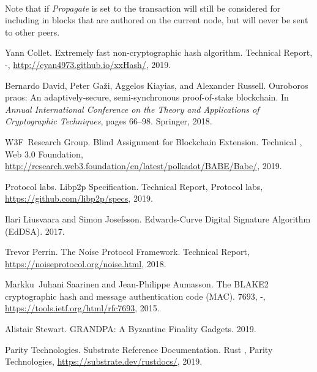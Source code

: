 \documentclass{book}
\newcommand{\tmem}[1]{{\em #1\/}}
\newcommand{\tmtextit}[1]{{\itshape{#1}}}
\newcommand{\tmtexttt}[1]{{\ttfamily{#1}}}
\newcommand{\tmverbatim}[1]{{\ttfamily{#1}}}
\providecommand{\tmem}[1]{\tmtextit{#1}}
\providecommand{\tmtextit}[1]{\tmtextit{#1}}
\providecommand{\tmverbatim}[1]{\tmtexttt{#1}}
\begin{document}
\

Note that if {\tmem{Propagate}} is set to \tmverbatim{false} the transaction
will still be considered for including in blocks that are authored on the
current node, but will never be sent to other peers.

\begin{thebibliography}{DGKR18}
  Yann Collet. {\newblock}Extremely fast
  non-cryptographic hash algorithm. {\newblock}Technical Report, -,
  \url{http://cyan4973.github.io/xxHash/}, 2019.{\newblock}
  
  Bernardo David, Peter Ga{\v z}i,
  Aggelos Kiayias, and  Alexander Russell. {\newblock}Ouroboros praos: An
  adaptively-secure, semi-synchronous proof-of-stake blockchain. {\newblock}In
  \tmtextit{Annual International Conference on the Theory and Applications of
  Cryptographic Techniques},  pages  66--98. Springer, 2018.{\newblock}
  
  W3F~Research Group.
  {\newblock}Blind Assignment for Blockchain Extension. {\newblock}Technical
  {}, Web 3.0 Foundation,
  \url{http://research.web3.foundation/en/latest/polkadot/BABE/Babe/},
  2019.{\newblock}
  
  Protocol labs. {\newblock}Libp2p
  Specification. {\newblock}Technical Report, Protocol labs,
  \url{https://github.com/libp2p/specs}, 2019.{\newblock}
  
  Ilari Liusvaara  and  Simon
  Josefsson. {\newblock}Edwards-Curve Digital Signature Algorithm (EdDSA).
  {\newblock}2017.{\newblock}
  
  Trevor Perrin. {\newblock}The Noise
  Protocol Framework. {\newblock}Technical Report,
  \url{https://noiseprotocol.org/noise.html}, 2018.{\newblock}
  
  Markku~Juhani Saarinen  and 
  Jean-Philippe Aumasson. {\newblock}The BLAKE2 cryptographic hash and message
  authentication code (MAC). {\newblock}{} 7693, -,
  \url{https://tools.ietf.org/html/rfc7693}, 2015.{\newblock}
  
  Alistair Stewart. {\newblock}GRANDPA:
  A Byzantine Finality Gadgets. {\newblock}2019.{\newblock}
  
  Parity Technologies.
  {\newblock}Substrate Reference Documentation. {\newblock}Rust
  {}, Parity Technologies,
  \url{https://substrate.dev/rustdocs/}, 2019.{\newblock}
\end{thebibliography}

\printindex
\end{document}
